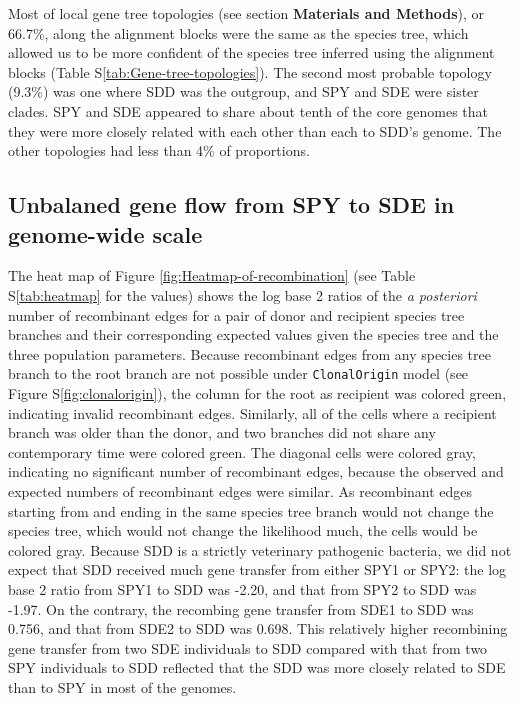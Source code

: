 \documentclass[english]{article}
\begin{document}
Most of local gene tree topologies (see section \textbf{Materials and Methods}),
or 66.7\%, along the alignment blocks were the same as the species tree, which
allowed us to be more confident of the species tree inferred using the alignment
blocks (Table S\ref{tab:Gene-tree-topologies}).  The second most probable
topology (9.3\%) was one where SDD was the outgroup, and SPY and SDE were
sister clades. SPY and SDE appeared to share about tenth of the core genomes that
they were more closely related with each other than each to SDD's genome. The
other topologies had less than 4\% of proportions.

\subsection{Unbalaned gene flow from SPY to SDE in genome-wide scale}

The heat map of Figure \ref{fig:Heatmap-of-recombination} (see Table
S\ref{tab:heatmap} for the values) shows the log base 2 ratios of the \textit{a
posteriori} number of recombinant edges for a pair of donor and recipient
species tree branches and their corresponding expected values given the species
tree and the three population parameters.  Because recombinant edges from any
species tree branch to the root branch are not possible under
\texttt{ClonalOrigin} model (see Figure S\ref{fig:clonalorigin}), the column for
the root as recipient was colored green, indicating invalid recombinant edges.
Similarly, all of the cells where a recipient branch was older than the donor,
and two branches did not share any contemporary time were colored green. The
diagonal cells were colored gray, indicating no significant number of
recombinant edges, because the observed and expected numbers of recombinant
edges were similar. As recombinant edges starting from and ending in the same
species tree branch would not change the species tree, which would not change
the likelihood much, the cells would be colored gray.  Because SDD is a strictly
veterinary pathogenic bacteria, we did not expect that SDD received much gene
transfer from either SPY1 or SPY2: the log base 2 ratio from SPY1 to SDD was
-2.20, and that from SPY2 to SDD was -1.97.  On the contrary, the recombing gene
transfer from SDE1 to SDD was 0.756, and that from SDE2 to SDD was 0.698. This
relatively higher recombining gene transfer from two SDE individuals to SDD
compared with that from two SPY individuals to SDD reflected that the SDD was
more closely related to SDE than to SPY in most of the genomes. 
\end{document}
